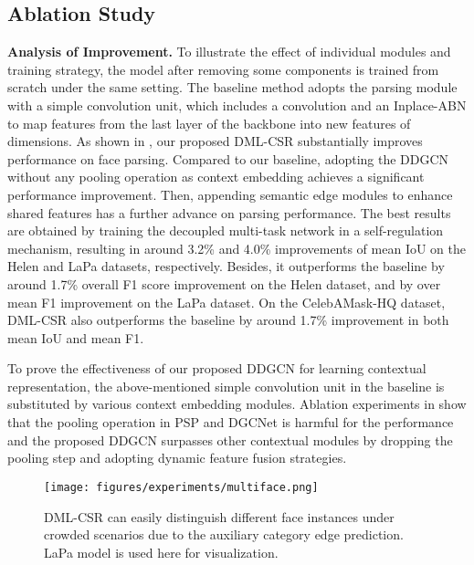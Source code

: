 \documentclass[10pt,twocolumn,letterpaper]{article}
\begin{document}
\subsection{Ablation Study}

\noindent\textbf{Analysis of Improvement.} To illustrate the effect of individual modules and training strategy, the model after removing some components is trained from scratch under the same setting. The baseline method adopts the parsing module with a simple convolution unit, which includes a  convolution and an Inplace-ABN \cite{inplace} to map features from the last layer of the backbone into new features of  dimensions. As shown in \tableautorefname{ \ref{tab:ablation}}, our proposed DML-CSR substantially improves performance on face parsing. Compared to our baseline, adopting the DDGCN without any pooling operation as context embedding achieves a significant performance improvement.
Then, appending semantic edge modules to enhance shared features has a further advance on parsing performance.
The best results are obtained by training the decoupled multi-task network in a self-regulation mechanism, resulting in around 3.2\% and 4.0\% improvements of mean IoU on the Helen and LaPa datasets, respectively. Besides, it outperforms the baseline by around 1.7\% overall F1 score improvement on the Helen dataset, and by over  mean F1 improvement on the LaPa dataset. On the CelebAMask-HQ dataset, DML-CSR also outperforms the baseline by around 1.7\% improvement in both mean IoU and mean F1.  

 To prove the effectiveness of our proposed DDGCN for learning contextual representation, the above-mentioned simple convolution unit in the baseline is substituted by various context embedding modules. Ablation experiments in \tableautorefname{ \ref{tab:ddgcn}} show that the pooling operation in PSP \cite{psp} and DGCNet \cite{zhangli_dgcn} is harmful for the performance and the proposed DDGCN surpasses other contextual modules by dropping the pooling step and adopting dynamic feature fusion strategies.
\begin{figure}
\centering
\texttt{[image: figures/experiments/multiface.png]}
\vspace{-2.5mm}
\caption{DML-CSR can easily distinguish different face instances under crowded scenarios due to the auxiliary category edge prediction. LaPa model is used here for visualization.}
\label{fig:multiface}
\vspace{-6mm}
\end{figure}
\end{document}
